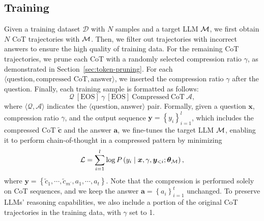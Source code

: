 \subsection{Training}
\label{sec:training}
Given a training dataset $\mathcal{D}$ with $N$ samples and a target LLM $\mathcal{M}$, we first obtain $N$ CoT trajectories with $\mathcal{M}$. Then, we filter out trajectories with incorrect answers to ensure the high quality of training data. For the remaining CoT trajectories, we prune each CoT with a randomly selected compression ratio $\gamma$, as demonstrated in Section~\ref{sec:token-pruning}. For each $\langle\text{question}, \text{compressed CoT}, \text{answer}\rangle$, we inserted the compression ratio $\gamma$ after the question. Finally, each training sample is formatted as follows: 
\begin{equation}
\nonumber
    \mathcal{Q} \ \mathrm{[EOS]} \ \gamma \ \mathrm{[EOS]} \ \mathrm{Compressed\ CoT} \ \mathcal{A},
\end{equation}
where $\langle\mathcal{Q}, \mathcal{A}\rangle$ indicates the $\langle\text{question}, \text{answer}\rangle$ pair. Formally, given a question $\boldsymbol{x}$, compression ratio $\gamma$, and the output sequence $\boldsymbol{y}=\left\{y_i\right\}_{i=1}^{l}$, which includes the compressed CoT $\widetilde{\boldsymbol{c}}$ and the answer $\boldsymbol{a}$, we fine-tunes the target LLM $\mathcal{M}$, enabling it to perform chain-of-thought in a compressed pattern by minimizing
\begin{equation}
\mathcal{L}=\sum_{i=1}^{l} \log P\left(y_{i} \mid \bm{x}, \gamma, \bm{y}_{<i}; \bm{\theta}_{\mathcal{M}}\right),
\end{equation}
where $\bm{y} =\left\{\widetilde{c}_1, \cdots,\widetilde{c}_{m^{\prime}}, a_1, \cdots, a_t  \right\}$. Note that the compression is performed solely on CoT sequences, and we keep the answer $\boldsymbol{a}=\left\{a_i\right\}_{i=1}^{t}$ unchanged. To preserve LLMs' reasoning capabilities, we also include a portion of the original CoT trajectories in the training data, with $\gamma$ set to 1.

